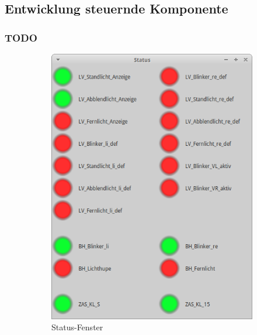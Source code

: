 \documentclass[]{beamer}
\begin{document}
\subsection{Entwicklung steuernde Komponente}
\begin{frame}
\frametitle{TODO}
    \begin{figure}
        \centering
        \begin{subfigure}[b]{0.59\textwidth}
            \centering
            \includegraphics[width=\textwidth]{vcan_app_status}
            \caption{Status-Fenster}
            \label{fig:vcan_app_status}
        \end{subfigure}
        \begin{subfigure}[b]{0.39\textwidth}
            \centering

\end{subfigure}
\end{figure}
\end{frame}
\end{document}
